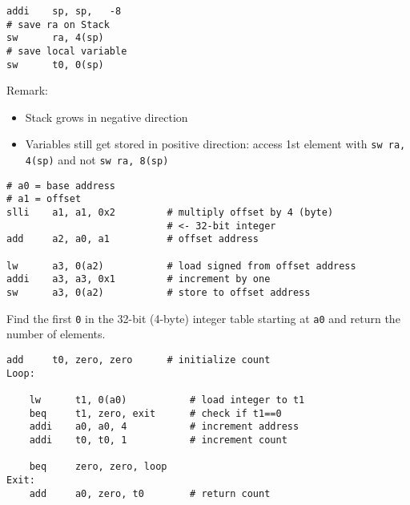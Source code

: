 \newpar{}

\begin{lstlisting}[language={[RISC-V]Assembler}]
addi    sp, sp,   -8
# save ra on Stack
sw      ra, 4(sp)
# save local variable
sw      t0, 0(sp)
\end{lstlisting}
Remark:
\begin{itemize}
    \item Stack grows in negative direction
    \item Variables still get stored in positive direction: access 1st element with \texttt{sw ra, 4(sp)} and not \texttt{sw ra, 8(sp)}
\end{itemize}

\newpar{}

\begin{lstlisting}[language={[RISC-V]Assembler}]
# a0 = base address
# a1 = offset
slli    a1, a1, 0x2         # multiply offset by 4 (byte) 
                            # <- 32-bit integer
add     a2, a0, a1          # offset address
 
lw      a3, 0(a2)           # load signed from offset address
addi    a3, a3, 0x1         # increment by one
sw      a3, 0(a2)           # store to offset address
\end{lstlisting}

\newpar{}

Find the first \texttt{0} in the 32-bit (4-byte) integer table starting at \texttt{a0} and return the number of elements.
\begin{lstlisting}[language={[RISC-V]Assembler}]
    add     t0, zero, zero      # initialize count
Loop:

    lw      t1, 0(a0)           # load integer to t1
    beq     t1, zero, exit      # check if t1==0
    addi    a0, a0, 4           # increment address
    addi    t0, t0, 1           # increment count

    beq     zero, zero, loop
Exit:
    add     a0, zero, t0        # return count
\end{lstlisting}


\newpar{}

